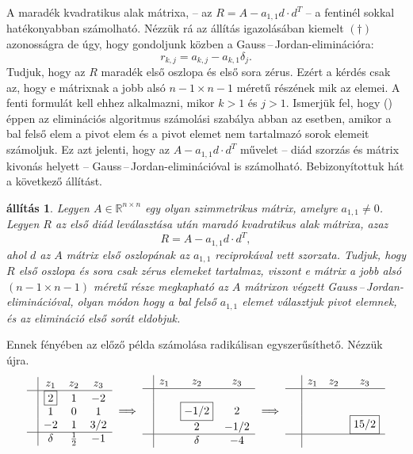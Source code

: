 \documentclass[9pt, a4paper, showtrims]{memoir}
\theoremstyle{plain}
\newtheorem{proposition}{állítás}[chapter]
\theoremstyle{remark}
\theoremstyle{definition}
\begin{document}
A maradék kvadratikus alak mátrixa, -- az $R=A-a_{1,1}d\cdot d^T$ -- a fentinél sokkal
hatékonyabban számolható.
Nézzük rá az állítás igazolásában kiemelt $(\dag)$ azonosságra de úgy,
hogy gondoljunk közben a Gauss\,--\,Jordan-eliminációra:
    \[
        r_{k,j}=
        a_{k,j}-a_{k,1}\delta_j.
        \tag{\dag}
    \]
Tudjuk, hogy az $R$ maradék első oszlopa és első sora zérus.
Ezért a kérdés csak az, 
hogy e mátrixnak a jobb alsó $n-1\times n-1$ méretű részének mik az elemei.
A fenti formulát kell ehhez alkalmazni, mikor $k>1$ és $j>1$.
Ismerjük fel, hogy (\dag)  éppen az eliminációs algoritmus számolási szabálya abban az esetben, 
amikor a bal felső elem a pivot elem és a pivot elemet nem tartalmazó sorok elemeit számoljuk.
Ez azt jelenti, hogy az $A-a_{1,1}d\cdot d^T$ művelet -- diád szorzás és mátrix kivonás helyett -- Gauss\,--\,Jordan-eliminációval is számolható.
Bebizonyítottuk hát a következő állítást.
\begin{proposition}
   Legyen $A\in\mathbb{R}^{n\times n}$ egy olyan szimmetrikus mátrix,
   amelyre $a_{1,1}\neq 0$.
   Legyen $R$ az első diád leválasztása után maradó kvadratikus alak mátrixa,
   azaz 
   $$R=A-a_{1,1}d\cdot d^T,$$
   ahol $d$ az $A$ mátrix első oszlopának az $a_{1,1}$ reciprokával vett szorzata.
   Tudjuk, hogy $R$ első oszlopa és sora csak zérus elemeket tartalmaz, viszont e
   mátrix a jobb alsó $\left(n-1\times n-1  \right)$ méretű része megkapható
   az $A$ mátrixon végzett Gauss\,--\,Jordan-eliminációval, 
   olyan módon hogy a bal felső $a_{1,1}$ elemet választjuk pivot elemnek, 
   és az elimináció első sorát eldobjuk.
\end{proposition}
Ennek fényében az előző példa számolása radikálisan egyszerűsíthető. Nézzük újra.
\[
\begin{array}{c|ccc}
     & z_1       & z_2 & z_3 \\
     \hline
     & \boxed{2} & 1   & -2  \\
     & 1         & 0   & 1   \\
     & -2        & 1   & 3/2 \\
    \hline
    & \delta    & \frac{1}{2}   & -1
\end{array}
\implies
\begin{array}{c|ccc}
     & z_1       & z_2  & z_3 \\
     \hline
     & &                &       \\
     & & \boxed{-1/2}   & 2     \\
     & &            2   & -1/2  \\
     \hline
     & & \delta         & -4
\end{array}
\implies
\begin{array}{c|ccc}
     & z_1       & z_2 & z_3 \\
     \hline
     & &   &     \\
     & &   &     \\
     & &   & \boxed{15/2}    \\
    \hline
    \phantom{\delta}
\end{array}
\]
\end{document}
